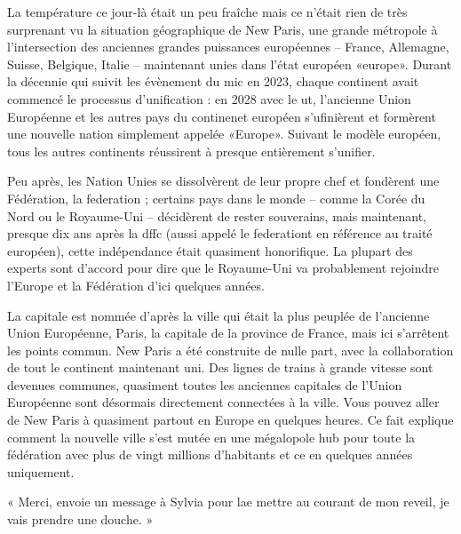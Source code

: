 \documentclass[12pt,hidelinks,a4paper]{book}
\begin{document}
\bigskip

La température ce jour-là était un peu fraîche mais ce n'était rien
de très surprenant vu la situation géographique de New Paris, une
grande métropole à l'intersection des anciennes grandes puissances
européennes -- France, Allemagne, Suisse, Belgique, Italie -- maintenant
unies dans l'état européen «\gls{europe}». Durant la décennie
qui suivit les évènement du \gls{mic} en 2023, chaque continent
avait commencé le processus d'unification : en 2028 avec le \gls{ut},
l'ancienne Union Européenne et les autres pays du continenet européen
s'ufinièrent et formèrent une nouvelle nation simplement appelée «Europe».
Suivant le modèle européen, tous les autres continents réussirent
à presque entièrement s'unifier.\par

\bigskip

Peu après, les Nation Unies se dissolvèrent de leur propre chef et
fondèrent une Fédération, la \gls{federation} ; certains pays dans
le monde -- comme la Corée du Nord ou le Royaume-Uni -- décidèrent
de rester souverains, mais maintenant, presque dix ans après la \gls{dffc}
(aussi appelé le \gls{federationt} en référence au traité européen),
cette indépendance était quasiment honorifique. La plupart des experts
sont d'accord pour dire que le Royaume-Uni va probablement rejoindre
l'Europe et la Fédération d'ici quelques années.\par

\bigskip

La capitale est nommée d'après la ville qui était la plus peuplée
de l'ancienne Union Européenne, Paris, la capitale de la province
de France, mais ici s'arrêtent les points commun. New Paris a été
construite de nulle part, avec la collaboration de tout le continent
maintenant uni. Des lignes de trains à grande vitesse sont devenues
communes, quasiment toutes les anciennes capitales de l'Union Européenne
sont désormais directement connectées à la ville. Vous pouvez aller
de New Paris à quasiment partout en Europe en quelques heures. Ce
fait explique comment la nouvelle ville s'est mutée en une mégalopole
hub pour toute la fédération avec plus de vingt millions d'habitants
et ce en quelques années uniquement.\par

\bigskip

« Merci, envoie un message à Sylvia pour lae mettre au courant de
mon reveil, je vais prendre une douche. »\par
\end{document}
